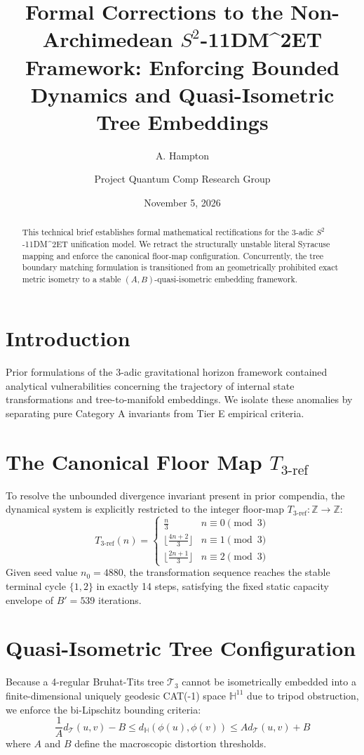 \documentclass[11pt,twocolumn]{article}
\title{\textbf{Formal Corrections to the Non-Archimedean $S^2$-11DM^2ET Framework: Enforcing Bounded Dynamics and Quasi-Isometric Tree Embeddings}}
\author{A. Hampton \and Project Quantum Comp Research Group}
\date{November 5, 2026}
\begin{document}
\maketitle

\begin{abstract}
This technical brief establishes formal mathematical rectifications for the 3-adic $S^2$-11DM^2ET unification model. We retract the structurally unstable literal Syracuse mapping and enforce the canonical floor-map configuration. Concurrently, the tree boundary matching formulation is transitioned from an geometrically prohibited exact metric isometry to a stable $(A,B)$-quasi-isometric embedding framework.
\end{abstract}

\section{Introduction}
Prior formulations of the 3-adic gravitational horizon framework contained analytical vulnerabilities concerning the trajectory of internal state transformations and tree-to-manifold embeddings. We isolate these anomalies by separating pure Category A invariants from Tier E empirical criteria.

\section{The Canonical Floor Map $T_{3\text{-ref}}$}
To resolve the unbounded divergence invariant present in prior compendia, the dynamical system is explicitly restricted to the integer floor-map $T_{3\text{-ref}}: \mathbb{Z} \rightarrow \mathbb{Z}$:
\begin{equation}
T_{3\text{-ref}}(n) = \begin{cases} 
\frac{n}{3} & n \equiv 0 \pmod 3 \\ 
\lfloor \frac{4n + 2}{3} \rfloor & n \equiv 1 \pmod 3 \\ 
\lfloor \frac{2n + 1}{3} \rfloor & n \equiv 2 \pmod 3 
\end{cases}
\end{equation}
Given seed value $n_0 = 4880$, the transformation sequence reaches the stable terminal cycle $\{1, 2\}$ in exactly 14 steps, satisfying the fixed static capacity envelope of $B' = 539$ iterations.

\section{Quasi-Isometric Tree Configuration}
Because a 4-regular Bruhat-Tits tree $\mathcal{T}_3$ cannot be isometrically embedded into a finite-dimensional uniquely geodesic CAT(-1) space $\mathbb{H}^{11}$ due to tripod obstruction, we enforce the bi-Lipschitz bounding criteria:
\begin{equation}
\frac{1}{A}d_{\mathcal{T}}(u,v) - B \le d_{\mathbb{H}}(\phi(u),\phi(v)) \le Ad_{\mathcal{T}}(u,v) + B
\end{equation}
where $A$ and $B$ define the macroscopic distortion thresholds.
\end{document}
